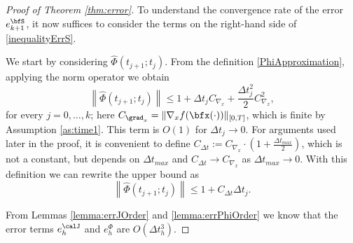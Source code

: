 \documentclass[DIV=12]{scrartcl} %
\newcommand{\err}{\ensuremath{e}}
\theoremstyle{definition}
\begin{document}
\begin{proof}[Proof of Theorem \ref{thm:error}]
To understand the convergence rate of the error $\err _{k+1} ^\bfS$, it now suffices to consider the terms on the right-hand side of \eqref{inequalityErrS}.

We start by considering $\hat \Phi (t_{j+1}; t_j)$. From the definition  \eqref{PhiApproximation}, applying the norm operator we obtain
\[
\left\|\hat{\Phi}(t_{j+1};t_j)\right\|\le 1 + \Delta t_j C_{\nabla_x} + \frac{\Delta t_j^2}{2}C_{\nabla_x}^2,
\]
for every $j=0,\dots, k$; here $C_{\grad _x} = \| \nabla _x f (\bfx (\cdot)) \| _{[0,T]}$, which is finite by Assumption \ref{as:time1}. This term is $O(1)$ for $\Delta t_j\to 0$. For arguments used later in the proof, it is convenient to define $C_{\Delta t}:=C_{\nabla_x}\cdot\left(1+\frac{\Delta t_{max}}{2}\right)$, which is not a constant, but depends on $\Delta t_{max}$ and $C_{\Delta t}\to C_{\nabla_x}$ as $\Delta t_{max}\to 0$. With this definition we can rewrite the upper bound as
\[
\left\|\hat{\Phi}(t_{j+1};t_j)\right\|\le 1 +C_{\Delta t}\Delta t_j.
\]

From Lemmas \ref{lemma:errJOrder} and \ref{lemma:errPhiOrder} we know that the error terms $\err_h^\calJ$ and $\err_h^{\Phi}$ are $O(\Delta t_h^3)$.


\end{proof}
\end{document}
